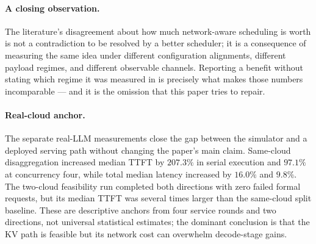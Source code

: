 \paragraph{A closing observation.}
The literature's disagreement about how much network-aware scheduling is worth is not a
contradiction to be resolved by a better scheduler; it is a consequence of measuring the same
idea under different configuration alignments, different payload regimes, and different
observable channels. Reporting a benefit without stating which regime it was measured in is
precisely what makes those numbers incomparable --- and it is the omission that this paper tries
to repair.

\paragraph{Real-cloud anchor.}
The separate real-LLM measurements close the gap between the simulator and a deployed serving
path without changing the paper's main claim. Same-cloud disaggregation increased median TTFT by
$207.3\%$ in serial execution and $97.1\%$ at concurrency four, while total median latency
increased by $16.0\%$ and $9.8\%$. The two-cloud feasibility run completed both directions with
zero failed formal requests, but its median TTFT was several times larger than the same-cloud
split baseline. These are descriptive anchors from four service rounds and two directions, not
universal statistical estimates; the dominant conclusion is that the KV path is feasible but its
network cost can overwhelm decode-stage gains.
